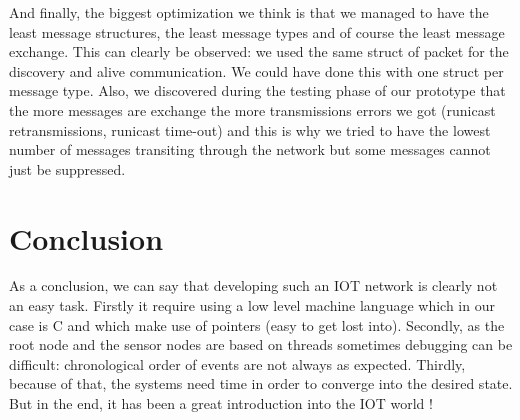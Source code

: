 \documentclass[a4paper,10pt]{article}
\begin{document}
And finally, the biggest optimization we think is that we managed to have the least message structures, the least message types and of course the least message exchange. This can clearly be observed: we used the same struct of packet for the discovery and alive communication. We could have done this with one struct per message type. Also, we discovered during the testing phase of our prototype that the more messages are exchange the more transmissions errors we got (runicast retransmissions, runicast time-out) and this is why we tried to have the lowest number of messages transiting through the network but some messages cannot just be suppressed.

\section{Conclusion}

As a conclusion, we can say that developing such an IOT network is clearly not an easy task. Firstly it require using a low level machine language which in our case is C and which make use of pointers (easy to get lost into). Secondly, as the root node and the sensor nodes are based on threads sometimes debugging can be difficult: chronological order of events are not always as expected. Thirdly, because of that, the systems need time in order to converge into the desired state. But in the end, it has been a great introduction into the IOT world !
\end{document}
